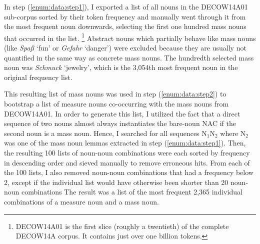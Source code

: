 \documentclass[USenglish]{article}
\newcommand{\Sub}[1]{\ensuremath{\mathrm{_{#1}}}}
\begin{document}
\vspace{-1\baselineskip}

In step (\ref{enum:data:step1}), I exported a list of all nouns in the DECOW14A01 sub-corpus sorted by their token frequency and manually went through it from the most frequent noun downwards, selecting the first one hundred mass nouns that occurred in the list.%
\footnote{DECOW14A01 is the first slice (roughly a twentieth) of the complete DECOW14A corpus.
It contains just over one billion tokens.}
Abstract nouns which partially behave like mass nouns (like \textit{Spaß} `fun’ or \textit{Gefahr} `danger’) were excluded because they are usually not quantified in the same way as concrete mass nouns.
The hundredth selected mass noun was \textit{Schmuck} `jewelry’, which is the 3,054th most frequent noun in the original frequency list.

This resulting list of mass nouns was used in step (\ref{enum:data:step2}) to bootstrap a list of measure nouns co-occurring with the mass nouns from DECOW14A01.
In order to generate this list, I utilized the fact that a direct sequence of two nouns almost always instantiates the bare-noun NAC if the second noun is a mass noun.
Hence, I searched for all sequences N\Sub{1}N\Sub{2} where N\Sub{2} was one of the mass noun lemmas extracted in step (\ref{enum:data:step1}).
Then, the resulting 100 lists of noun-noun combinations were each sorted by frequency in descending order and sieved manually to remove erroneous hits.
From each of the 100 lists, I also removed noun-noun combinations that had a frequency below 2, except if the individual list would have otherwise been shorter than 20 noun-noun combinations
The result was a list of the most frequent 2,365 individual combinations of a measure noun and a mass noun.
\end{document}
